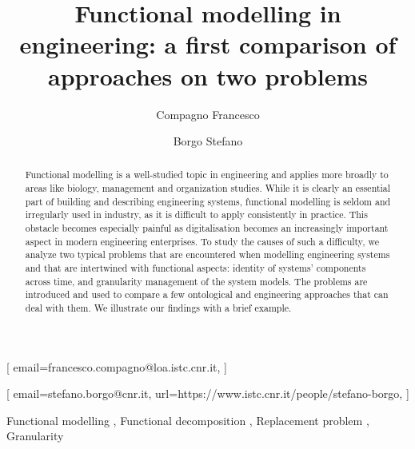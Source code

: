 \documentclass[
]{ceurart}
\begin{document}


\title{Functional modelling in engineering: a first comparison of approaches on two problems}


\author[1,2]{Compagno Francesco}[%
email=francesco.compagno@loa.istc.cnr.it,
]
\cormark[1]
\address[1]{ISTC-CNR Laboratory for Applied Ontology, via alla cascata 56/C, 38123, Povo, Italy}
\address[2]{Adige S.P.A, via per Barco, 11, Levico Terme, 38056, Italy}

\author[1]{Borgo Stefano}[%
email=stefano.borgo@cnr.it,
url=https://www.istc.cnr.it/people/stefano-borgo,
]



\begin{abstract}
  Functional modelling is a well-studied topic in engineering and applies more broadly to areas like biology, management and organization studies. 
  While it is clearly an essential part of building and describing engineering systems,
  functional modelling is seldom and irregularly used in industry, as it is difficult to apply consistently in practice.
  This obstacle becomes especially painful as digitalisation becomes an increasingly important aspect in modern engineering enterprises.
  To study the causes of such a difficulty, we analyze two typical problems that are encountered when modelling engineering systems and that are intertwined with functional aspects: identity of systems' components across time, and granularity management of the system models.
  The problems are introduced and used to compare a few ontological and engineering approaches that can deal with them.
  We illustrate our findings with a brief example.
\end{abstract}

\begin{keywords}
  Functional modelling \sep
  Functional decomposition \sep
  Replacement problem \sep
  Granularity
\end{keywords}
\end{document}
